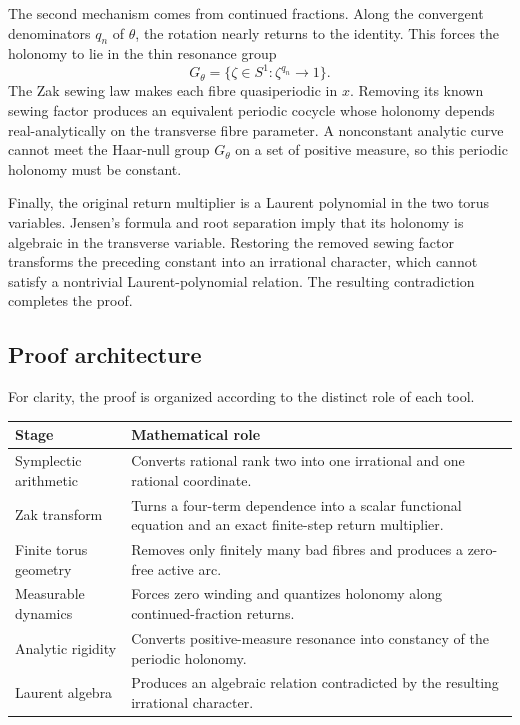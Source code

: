 \documentclass[reqno]{amsart}
\theoremstyle{remark}
\numberwithin{equation}{section}
\begin{document}
The second mechanism comes from continued fractions. Along the convergent
denominators \(q_n\) of \(\theta\), the rotation nearly returns to the
identity. This forces the holonomy to lie in the thin resonance group
\[
  G_\theta=\{\zeta\in S^1:\zeta^{q_n}\to1\}.
\]
The Zak sewing law makes each fibre quasiperiodic in \(x\). Removing its
known sewing factor produces an equivalent periodic cocycle whose holonomy
depends real-analytically on the transverse fibre parameter. A nonconstant
analytic curve cannot meet the Haar-null group \(G_\theta\) on a set of
positive measure, so this periodic holonomy must be constant.

Finally, the original return multiplier is a Laurent polynomial in the two
torus variables. Jensen's formula and root separation imply that its holonomy
is algebraic in the transverse variable. Restoring the removed sewing factor
transforms the preceding constant into an irrational character, which cannot
satisfy a nontrivial Laurent-polynomial relation. The resulting contradiction
completes the proof.

\subsection{Proof architecture}

For clarity, the proof is organized according to the distinct role of each
tool.

\begin{center}
\small
\renewcommand{\arraystretch}{1.18}
\begin{tabularx}{0.96\textwidth}{>{\raggedright\arraybackslash}p{}X}
\toprule
\textbf{Stage} & \textbf{Mathematical role}\\
\midrule
Symplectic arithmetic
& Converts rational rank two into one irrational and one rational coordinate.\\
Zak transform
& Turns a four-term dependence into a scalar functional equation and an exact
finite-step return multiplier.\\
Finite torus geometry
& Removes only finitely many bad fibres and produces a zero-free active arc.\\
Measurable dynamics
& Forces zero winding and quantizes holonomy along continued-fraction returns.\\
Analytic rigidity
& Converts positive-measure resonance into constancy of the periodic holonomy.\\
Laurent algebra
& Produces an algebraic relation contradicted by the resulting irrational
character.\\
\bottomrule
\end{tabularx}
\end{center}
\end{document}
